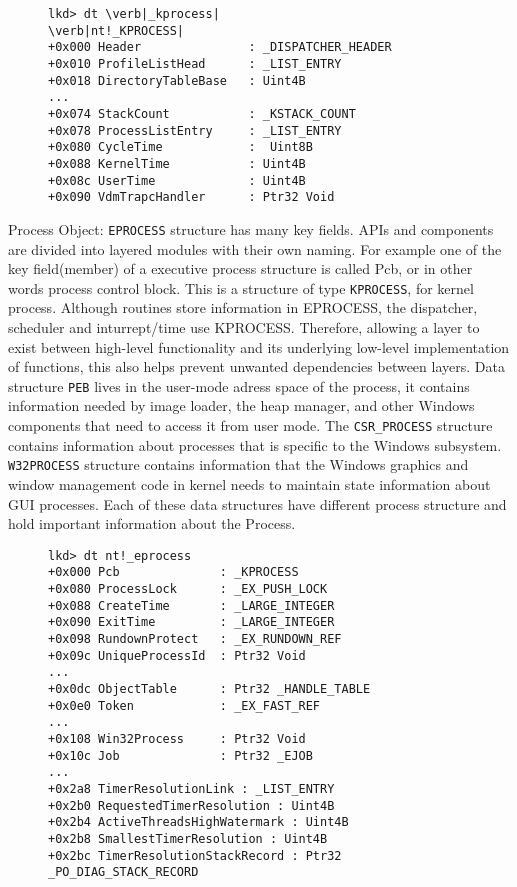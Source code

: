 \documentclass[letterpaper,10pt,draftclsnofoot,onecolumn]{IEEEtran}
\begin{document}
\begin{figure}[H]
\begin{lstlisting}
lkd> dt \verb|_kprocess|
\verb|nt!_KPROCESS|
+0x000 Header				: _DISPATCHER_HEADER
+0x010 ProfileListHead 		: _LIST_ENTRY
+0x018 DirectoryTableBase	: Uint4B
...
+0x074 StackCount			: _KSTACK_COUNT
+0x078 ProcessListEntry 	: _LIST_ENTRY
+0x080 CycleTime			:  Uint8B
+0x088 KernelTime			: Uint4B
+0x08c UserTime				: Uint4B
+0x090 VdmTrapcHandler		: Ptr32 Void
\end{lstlisting}
\end{figure}
Process Object: \verb|EPROCESS| structure has many key fields. APIs and components are divided into layered modules with their own naming. For example one of the key field(member) of a executive process structure is called Pcb, or in other words process control block. This is a structure of type \verb|KPROCESS|, for kernel process. Although routines store information in EPROCESS, the dispatcher, scheduler and inturrept/time use KPROCESS. Therefore, allowing a layer to exist between high-level functionality and its underlying low-level implementation of functions, this also helps prevent unwanted dependencies between layers. Data structure \verb|PEB| lives in the user-mode adress space of the process, it contains information needed by image loader, the heap manager, and other Windows components that need to access it from user mode. The \verb|CSR_PROCESS| structure contains information about processes that is specific to the Windows subsystem. \verb|W32PROCESS| structure contains information that the Windows graphics and window management code in kernel needs to maintain state information about GUI processes. Each of these data structures have different process structure and hold important information about the Process.
\begin{figure}[H]
\begin{lstlisting}
lkd> dt nt!_eprocess
+0x000 Pcb				: _KPROCESS
+0x080 ProcessLock		: _EX_PUSH_LOCK
+0x088 CreateTime		: _LARGE_INTEGER
+0x090 ExitTime			: _LARGE_INTEGER
+0x098 RundownProtect	: _EX_RUNDOWN_REF
+0x09c UniqueProcessId 	: Ptr32 Void
...
+0x0dc ObjectTable		: Ptr32 _HANDLE_TABLE
+0x0e0 Token			: _EX_FAST_REF
...
+0x108 Win32Process		: Ptr32 Void
+0x10c Job				: Ptr32 _EJOB
...
+0x2a8 TimerResolutionLink : _LIST_ENTRY
+0x2b0 RequestedTimerResolution : Uint4B	
+0x2b4 ActiveThreadsHighWatermark : Uint4B
+0x2b8 SmallestTimerResolution : Uint4B
+0x2bc TimerResolutionStackRecord : Ptr32 _PO_DIAG_STACK_RECORD
\end{lstlisting}
\end{figure}
\end{document}
